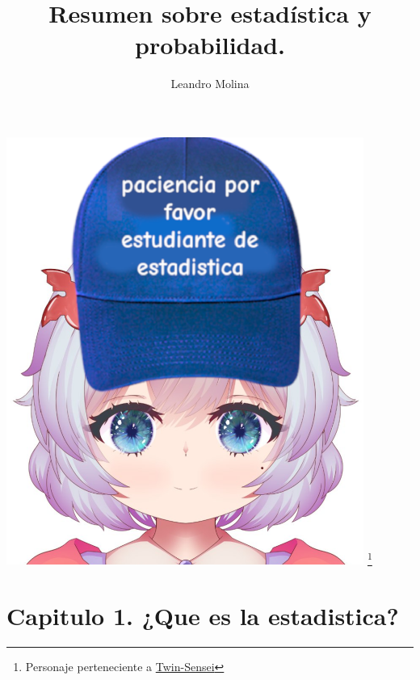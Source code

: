 \documentclass[]{article}
\title{Resumen sobre estadística y probabilidad.}
\author{Leandro Molina}
\begin{document}
\maketitle
\vspace{-20pt}

\noindent
\includegraphics[width=\linewidth, height=14cm]{twin_estadistica.png}
\footnote{Personaje perteneciente a \href{https://www.youtube.com/@TwinSensei}{Twin-Sensei}}
\pagebreak

\tableofcontents


\pagebreak
\section{Capitulo 1. ¿Que es la estadistica?}
\end{document}
